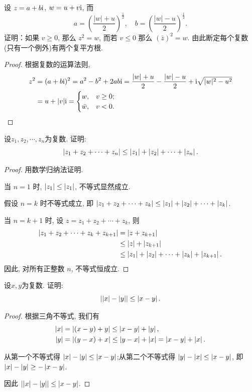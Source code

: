 \documentclass{article}
\begin{document}
\begin{problem}[1-10]
设 \( z = a + b \mathrm{i} \), \( w = u + v \mathrm{i} \), 而
\[
a = \left( \frac{|w| + u}{2} \right)^{\frac{1}{2}}, \quad
b = \left( \frac{|w| - u}{2} \right)^{\frac{1}{2}}.
\]
证明：如果 \( v \geq 0 \), 那么 \( z^2 = w \), 而若 \( v \leq 0 \) 那么 \( (\bar{z})^2 = w \). 由此断定每个复数(只有一个例外)有两个复平方根. 
\end{problem}

\begin{proof}
根据复数的运算法则, 
\begin{align*}
 z^2 &= (a + b \mathrm{i})^2 = a^2 - b^2 + 2 a b \mathrm{i}=\frac{|w|+u}{2}-\frac{|w|-u}{2}+\mathrm{i}\sqrt{|w|^2-u^2}  \\
 &=u+ |v|\mathrm{i} =\begin{cases}
w, & v \ge 0;\\
\bar{w}, & v < 0.\end{cases} 
\end{align*}
\end{proof}

\begin{problem}[1-12]
设$ z_1,z_2,\cdots,z_n $为复数. 证明: 
\[ \left|z_1+z_2+\cdots+z_n\right|\le\left|z_1\right|+\left|z_2\right|+\cdots+\left|z_n\right|. \] 
\end{problem}


\begin{proof}
用数学归纳法证明.\par
当 $n=1$ 时, $\left|z_1\right| \le \left|z_1\right|$, 不等式显然成立.\par
假设 $n=k$ 时不等式成立, 即 $\left|z_1+z_2+\cdots+z_k\right|\le\left|z_1\right|+\left|z_2\right|+\cdots+\left|z_k\right|$.\par
当 $n=k+1$ 时, 设 $z=z_1+z_2+\cdots+z_k$, 则
\begin{align*}
\left|z_1+z_2+\cdots+z_k+z_{k+1}\right| &= \left|z+z_{k+1}\right|\\
&\le \left|z\right|+\left|z_{k+1}\right|\\
&\le \left|z_1\right|+\left|z_2\right|+\cdots+\left|z_k\right|+\left|z_{k+1}\right|.
\end{align*}
因此, 对所有正整数 $n$, 不等式恒成立.
\end{proof}

\begin{problem}[1-13]
设$ x,y $为复数. 证明: 
\[ \left|\left|x\right|-\left|y\right|\right|\le\left|x-y\right|. \] 
\end{problem}

\begin{proof}
根据三角不等式, 我们有
\begin{align*}
\left|x\right| &= \left|(x-y)+y\right| \le \left|x-y\right|+\left|y\right|,\\
\left|y\right| &= \left|(y-x)+x\right| \le \left|y-x\right|+\left|x\right| = \left|x-y\right|+\left|x\right|.
\end{align*}\par 
从第一个不等式得 $\left|x\right|-\left|y\right| \le \left|x-y\right|$;从第二个不等式得 $\left|y\right|-\left|x\right| \le \left|x-y\right|$, 即 $\left|x\right|-\left|y\right| \ge -\left|x-y\right|$.\par
因此 $\left|\left|x\right|-\left|y\right|\right| \le \left|x-y\right|$.
\end{proof}
\end{document}
